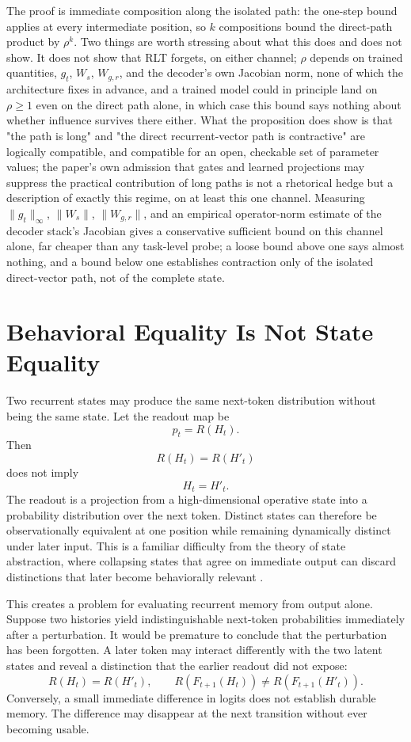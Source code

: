 \documentclass[11pt]{article}
\begin{document}
The proof is immediate composition along the isolated path: the one-step bound applies at every intermediate position, so $k$ compositions bound the direct-path product by $\rho^k$. Two things are worth stressing about what this does and does not show. It does not show that RLT forgets, on either channel; $\rho$ depends on trained quantities, $g_t$, $W_s$, $W_{g,r}$, and the decoder's own Jacobian norm, none of which the architecture fixes in advance, and a trained model could in principle land on $\rho \ge 1$ even on the direct path alone, in which case this bound says nothing about whether influence survives there either. What the proposition does show is that "the path is long" and "the direct recurrent-vector path is contractive" are logically compatible, and compatible for an open, checkable set of parameter values; the paper's own admission that gates and learned projections may suppress the practical contribution of long paths is not a rhetorical hedge but a description of exactly this regime, on at least this one channel. Measuring $\|g_t\|_\infty$, $\|W_s\|$, $\|W_{g,r}\|$, and an empirical operator-norm estimate of the decoder stack's Jacobian gives a conservative sufficient bound on this channel alone, far cheaper than any task-level probe; a loose bound above one says almost nothing, and a bound below one establishes contraction only of the isolated direct-vector path, not of the complete state.

\section{Behavioral Equality Is Not State Equality}
\label{sec:behavioral-equality}

Two recurrent states may produce the same next-token distribution without being the same state. Let the readout map be
\[
p_t = R(H_t).
\]
Then
\[
R(H_t) = R(H'_t)
\]
does not imply
\[
H_t = H'_t.
\]
The readout is a projection from a high-dimensional operative state into a probability distribution over the next token. Distinct states can therefore be observationally equivalent at one position while remaining dynamically distinct under later input. This is a familiar difficulty from the theory of state abstraction, where collapsing states that agree on immediate output can discard distinctions that later become behaviorally relevant \cite{li2006abstraction}.

This creates a problem for evaluating recurrent memory from output alone. Suppose two histories yield indistinguishable next-token probabilities immediately after a perturbation. It would be premature to conclude that the perturbation has been forgotten. A later token may interact differently with the two latent states and reveal a distinction that the earlier readout did not expose:
\[
R(H_t) = R(H'_t),
\qquad
R(F_{t+1}(H_t)) \neq R(F_{t+1}(H'_t)).
\]
Conversely, a small immediate difference in logits does not establish durable memory. The difference may disappear at the next transition without ever becoming usable.
\end{document}

